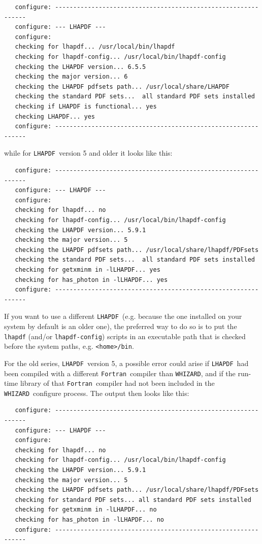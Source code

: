 \documentclass[12pt]{book}
\newcommand{\ttt}[1]{\texttt{#1}}
\newcommand{\whizard}{\ttt{WHIZARD}}
\newcommand{\lhapdf}{\ttt{LHAPDF}}
\newcommand{\fortran}{\ttt{Fortran}}
\begin{document}
\begin{footnotesize}
\begin{verbatim}
   configure: --------------------------------------------------------------
   configure: --- LHAPDF ---
   configure:
   checking for lhapdf... /usr/local/bin/lhapdf
   checking for lhapdf-config... /usr/local/bin/lhapdf-config
   checking the LHAPDF version... 6.5.5
   checking the major version... 6
   checking the LHAPDF pdfsets path... /usr/local/share/LHAPDF
   checking the standard PDF sets...  all standard PDF sets installed
   checking if LHAPDF is functional... yes
   checking LHAPDF... yes
   configure: --------------------------------------------------------------
\end{verbatim}
\end{footnotesize}
while for \lhapdf\ version 5 and older it looks like this:

\begin{footnotesize}
\begin{verbatim}
   configure: --------------------------------------------------------------
   configure: --- LHAPDF ---
   configure:
   checking for lhapdf... no
   checking for lhapdf-config... /usr/local/bin/lhapdf-config
   checking the LHAPDF version... 5.9.1
   checking the major version... 5
   checking the LHAPDF pdfsets path... /usr/local/share/lhapdf/PDFsets
   checking the standard PDF sets...  all standard PDF sets installed
   checking for getxminm in -lLHAPDF... yes
   checking for has_photon in -lLHAPDF... yes
   configure: --------------------------------------------------------------
\end{verbatim}
\end{footnotesize}

If you want to use a different \lhapdf\ (e.g. because the one installed
on your system by default is an older one), the preferred way to do so
is to put the \ttt{lhapdf} (and/or \ttt{lhapdf-config}) scripts in an
executable path that is checked before the system paths,
e.g. \ttt{<home>/bin}.

For the old series, \lhapdf\ version 5, a possible error could arise
if \lhapdf\ had been compiled with a different \fortran\ compiler than
\whizard, and if the run-time library of that \fortran\ compiler had
not been included in the \whizard\ configure process. The output then
looks like this:

\begin{footnotesize}
\begin{verbatim}
   configure: --------------------------------------------------------------
   configure: --- LHAPDF ---
   configure:
   checking for lhapdf... no
   checking for lhapdf-config... /usr/local/bin/lhapdf-config
   checking the LHAPDF version... 5.9.1
   checking the major version... 5
   checking the LHAPDF pdfsets path... /usr/local/share/lhapdf/PDFsets
   checking for standard PDF sets... all standard PDF sets installed
   checking for getxminm in -lLHAPDF... no
   checking for has_photon in -lLHAPDF... no
   configure: --------------------------------------------------------------
\end{verbatim}
\end{footnotesize}
\end{document}
